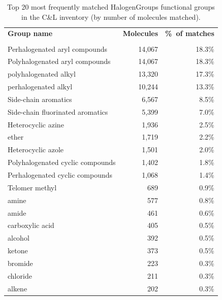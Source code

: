\begin{table}[htbp]
\centering
\caption{Top 20 most frequently matched HalogenGroups functional groups
  in the C\&L inventory (by number of molecules matched).}
\label{tab:clinventory_hg_top_groups}
\begin{tabular}{lrr}
\toprule
\rowcolor[HTML]{D6E4F5}\textbf{Group name} & \textbf{Molecules} & \textbf{\%\ of matches} \\\\
\midrule
  \rowcolor[HTML]{FAEADE}Perhalogenated aryl compounds & 14,067 & 18.3\% \\
  Polyhalogenated aryl compounds & 14,067 & 18.3\% \\
  \rowcolor[HTML]{FAEADE}polyhalogenated alkyl & 13,320 & 17.3\% \\
  perhalogenated alkyl & 10,244 & 13.3\% \\
  \rowcolor[HTML]{FAEADE}Side-chain aromatics & 6,567 & 8.5\% \\
  Side-chain fluorinated aromatics & 5,399 & 7.0\% \\
  \rowcolor[HTML]{FAEADE}Heterocyclic azine & 1,936 & 2.5\% \\
  ether & 1,719 & 2.2\% \\
  \rowcolor[HTML]{FAEADE}Heterocyclic azole & 1,501 & 2.0\% \\
  Polyhalogenated cyclic compounds & 1,402 & 1.8\% \\
  \rowcolor[HTML]{FAEADE}Perhalogenated cyclic compounds & 1,068 & 1.4\% \\
  Telomer methyl & 689 & 0.9\% \\
  \rowcolor[HTML]{FAEADE}amine & 577 & 0.8\% \\
  amide & 461 & 0.6\% \\
  \rowcolor[HTML]{FAEADE}carboxylic acid & 405 & 0.5\% \\
  alcohol & 392 & 0.5\% \\
  \rowcolor[HTML]{FAEADE}ketone & 373 & 0.5\% \\
  bromide & 223 & 0.3\% \\
  \rowcolor[HTML]{FAEADE}chloride & 211 & 0.3\% \\
  alkene & 202 & 0.3\% \\
\bottomrule
\end{tabular}
\end{table}


